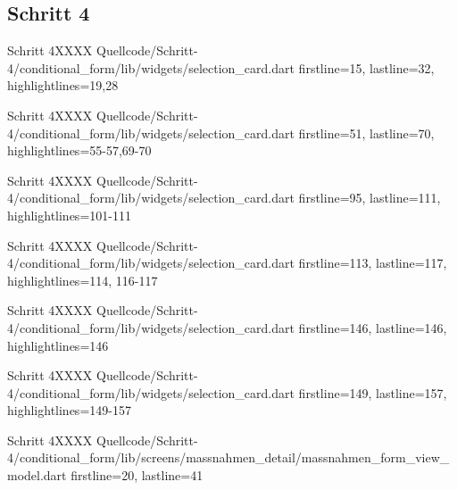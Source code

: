 \ifincludeall \clearpage \fi 

\subsection{Schritt 4}

\begin{alexlisting}{Schritt 4}{XXXX}
    {Quellcode/Schritt-4/conditional_form/lib/widgets/selection_card.dart}
    {firstline=15, lastline=32, highlightlines={19,28}}
    \label{lst:Schritt4XXXX}
\end{alexlisting}

\begin{alexlisting}{Schritt 4}{XXXX}
    {Quellcode/Schritt-4/conditional_form/lib/widgets/selection_card.dart}
    {firstline=51, lastline=70, highlightlines={55-57,69-70}}
    \label{lst:Schritt4XXXX}
\end{alexlisting}

\begin{alexlisting}{Schritt 4}{XXXX}
    {Quellcode/Schritt-4/conditional_form/lib/widgets/selection_card.dart}
    {firstline=95, lastline=111, highlightlines={101-111}}
    \label{lst:Schritt4XXXX}
\end{alexlisting}


\begin{alexlisting}{Schritt 4}{XXXX}
    {Quellcode/Schritt-4/conditional_form/lib/widgets/selection_card.dart}
    {firstline=113, lastline=117, highlightlines={114, 116-117}}
    \label{lst:Schritt4XXXX}
\end{alexlisting}

\begin{alexlisting}{Schritt 4}{XXXX}
    {Quellcode/Schritt-4/conditional_form/lib/widgets/selection_card.dart}
    {firstline=146, lastline=146, highlightlines={146}}
    \label{lst:Schritt4XXXX}
\end{alexlisting}

\begin{alexlisting}{Schritt 4}{XXXX}
    {Quellcode/Schritt-4/conditional_form/lib/widgets/selection_card.dart}
    {firstline=149, lastline=157, highlightlines={149-157}}
    \label{lst:Schritt4XXXX}
\end{alexlisting}


\begin{alexlisting}{Schritt 4}{XXXX}
    {Quellcode/Schritt-4/conditional_form/lib/screens/massnahmen_detail/massnahmen_form_view_model.dart}
    {firstline=20, lastline=41}
    \label{lst:Schritt4XXXXX}
  \end{alexlisting}

